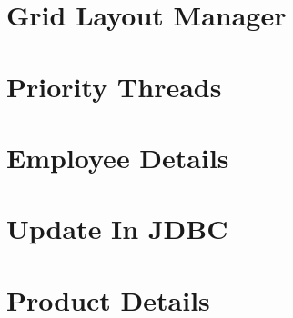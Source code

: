 \documentclass{article}
\begin{document}
\section{Grid Layout Manager}

\newpage

\section{Priority Threads}

\newpage

\section{Employee Details}

\newpage

\section{Update In JDBC}

\newpage

\section{Product Details}

\newpage

%
%
%
\end{document}
